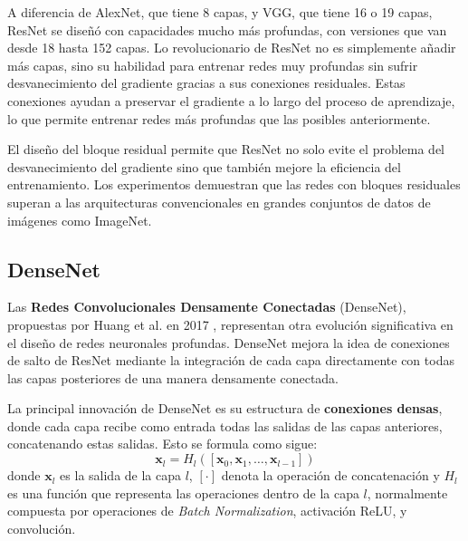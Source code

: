 A diferencia de AlexNet, que tiene 8 capas, y VGG, que tiene 16 o 19 capas, ResNet
se diseñó con capacidades mucho más profundas, con versiones que van desde 18
hasta 152 capas. Lo revolucionario de ResNet no es simplemente añadir más capas,
sino su habilidad para entrenar redes muy profundas sin sufrir desvanecimiento
del gradiente gracias a sus conexiones residuales. Estas conexiones ayudan a preservar
el gradiente a lo largo del proceso de aprendizaje, lo que permite entrenar
redes más profundas que las posibles anteriormente.

El diseño del bloque residual permite que ResNet no solo evite el problema del
desvanecimiento del gradiente sino que también mejore la eficiencia del
entrenamiento. Los experimentos demuestran que las redes con bloques residuales superan
a las arquitecturas convencionales en grandes conjuntos de datos de imágenes como
ImageNet.

\subsection{DenseNet}

Las \textbf{Redes Convolucionales Densamente Conectadas} (DenseNet), propuestas
por Huang et al. en 2017 \cite{huang2017densely}, representan otra evolución
significativa en el diseño de redes neuronales profundas. DenseNet mejora la idea
de conexiones de salto de ResNet mediante la integración de cada capa directamente
con todas las capas posteriores de una manera densamente conectada.

La principal innovación de DenseNet es su estructura de \textbf{conexiones
	densas}, donde cada capa recibe como entrada todas las salidas de las capas anteriores,
concatenando estas salidas. Esto se formula como sigue:
\begin{equation}
	\mathbf{x}_{l} = H_{l}([\mathbf{x}_{0}, \mathbf{x}_{1}, \dots, \mathbf{x}_{l-1}
	])
\end{equation}
donde $\mathbf{x}_{l}$ es la salida de la capa $l$, $[ \cdot ]$ denota la operación
de concatenación y $H_{l}$ es una función que representa las operaciones dentro de
la capa $l$, normalmente compuesta por operaciones de \textit{Batch
	Normalization}, activación ReLU, y convolución.


